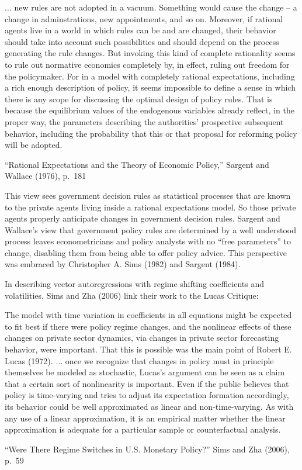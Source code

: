 \epigraph{$\ldots$ new rules are not adopted
in a vacuum. Something would cause the change -- a change in adminstrations,
new appointments, and so on. Moreover, if rational agents live in a world in
which rules can be and are changed, their behavior should take into account such
possibilities and should depend on the process generating the rule changes. But
invoking this kind of complete rationality seems to rule out normative economics
completely by, in effect, ruling out freedom for the policymaker. For in a model
with completely rational expectations, including a rich enough description
of policy, it seems impossible to define a sense in which there is any scope for
discussing the optimal design of policy rules. That is because the equilibrium
values of the endogenous variables already reflect, in the proper way, the
parameters
describing the authorities' prospective subsequent behavior, including
the probability that this or that proposal for reforming policy will be adopted.}{``Rational Expectations and the Theory of Economic Policy,''
Sargent and Wallace (1976), p.~181}


%
%

This view sees  government decision rules as  statistical processes
 that are known to the private agents living inside a rational expectations model.  
 So  those private agents properly anticipate changes in government decision rules.
 Sargent and Wallace's   view that  government policy rules  are
determined by a well understood process  leaves  econometricians and policy analysts with
 no ``free parameters'' to change,
disabling them from being able to offer policy advice.
This perspective  was embraced  by
 Christopher A. Sims (1982) and Sargent (1984).
 
%
%

In describing  vector autoregressions with regime shifting coefficients and volatilities, Sims and Zha (2006)  link
their work to the Lucas Critique: %
\epigraph
{The model with time variation in coefficients in all equations might be expected to fit best if there 
were policy regime changes, and the nonlinear effects of these changes on private sector dynamics, via
 changes in private sector forecasting behavior, were important. That this is possible was the main point 
 of Robert E. Lucas (1972).
$\ldots$ %
once we recognize that changes in policy must in principle themselves be modeled as 
stochastic, Lucas's argument can be seen as a claim that a certain sort of nonlinearity is important. Even if the public believes that policy is time-varying and tries to adjust its expectation formation accordingly, its behavior could be well approximated as linear and non-time-varying. As with any use of a linear approximation, it is an empirical matter whether the linear approximation is adequate for a particular sample or counterfactual analysis.}{``Were There Regime  Switches in U.S. Monetary Policy?'' Sims and Zha (2006), p.~59}


